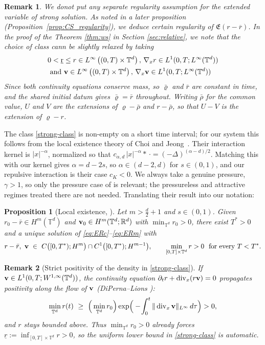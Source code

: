 \documentclass[12pt,a4paper,twoside]{article}
\newcommand{\Ov}[1]{\overline{#1}}
\newcommand{\vr}{\varrho}
\newcommand{\vv}{\vc{v}}
\newcommand{\vc}[1]{{\bf #1}}
\newcommand{\lr}[1]{\left( #1 \right)}
\newtheorem{prop}[thm]{Proposition}
\newtheorem{rmk}{Remark}
\numberwithin{equation}{section}%
\newcommand{\T}{\mathbb{T}}
\newcommand{\Gradx}{\nabla_x}
\newcommand{\Divx}{\operatorname{div}_x}
\begin{document}
	\begin{rmk}
		We donot put any separate regularity assumption for the extended variable of strong solution.  As noted in a later proposition (Proposition~\ref{prop:CS_regularity}), we deduce certain regularity of $\mathfrak{E}(r-\Ov{r})$. In the proof of the Theorem \ref{thm:ws} in Section \ref{sec:relative}, we note that the choice of class cann be slightly relaxed by taking 
		\begin{align*}
	&	0 <	\underbar{r}\leq r \in L^\infty\lr{(0,T)\times \T^d}, \, \Gradx r \in L^1(0,T; L^\infty(\T^d)) \\ &\text{ and }  \vv \in L^\infty\lr{(0,T)\times \T^d}, \, \Gradx \vv \in L^1(0,T; L^\infty(\T^d)) 
		\end{align*}
			Since both continuity equations conserve mass, so $\bar\vr$ and $\bar r$ are constant in time, and the shared initial datum gives $\bar\vr=\bar r$ throughout. Writing $\bar\rho$ for the common value, $U$ and $V$ are the extensions of $\vr-\bar\rho$ and $r-\bar\rho$, so that $U-V$ is the extension of $\vr-r$.
	\end{rmk} 
	
	\medskip

The class \eqref{strong-class} is non-empty on a short time interval; for our system this
follows from the local existence theory of Choi and Jeong~\cite{CJ2022}. Their interaction
kernel is $|x|^{-\alpha}$, normalized so that $c_{\alpha,d}\,|x|^{-\alpha}\ast\,\cdot
=(-\Delta)^{(\alpha-d)/2}$. Matching this with our kernel gives $\alpha=d-2s$, so
$\alpha\in(d-2,d)$ for $s\in(0,1)$, and our repulsive interaction is their case $c_K<0$. We
always take a genuine pressure, $\gamma>1$, so only the pressure case of \cite{CJ2022} is
relevant; the pressureless and attractive regimes treated there are not needed. Translating
their result into our notation:

\begin{prop}[Local existence, {\cite[Thm.~4.1 and Rmk.~4.3]{CJ2022}}]\label{prop:local-existence}
	Let $m>\tfrac d2+1$ and $s\in(0,1)$. Given $r_0-\bar r\in H^m(\mathbb T^d)$ and
	$\vv_0\in H^m(\mathbb T^d;\mathbb R^d)$ with $\min_{\mathbb T^d} r_0>0$, there exist $T^*>0$
	and a unique solution of \eqref{eq:ERc}--\eqref{eq:ERm} with
	\[
	r-\bar r,\ \vv\ \in\ C\big([0,T^*);H^m\big)\cap C^1\big([0,T^*);H^{m-1}\big),
	\qquad \min_{[0,T]\times\mathbb T^d} r>0 \ \text{ for every } T<T^*.
	\]
\end{prop}

\begin{rmk}[Strict positivity of the density in \eqref{strong-class}]\label{rem:strong-class}
	If $\vv\in L^1(0,T;W^{1,\infty}(\T^d))$, the continuity equation
	$\partial_t r+\Divx(r\vv)=0$ propagates positivity along the flow of $\vv$ (DiPerna--Lions
	\cite{DiL1989}):
	\[
	\min_{\mathbb T^d} r(t)\ \ge\ \Big(\min_{\mathbb T^d} r_0\Big)
	\exp\!\Big(-\!\int_0^t\|\Divx\vv\|_{L^\infty}\,d\tau\Big)>0 ,
	\]
	and $r$ stays bounded above. Thus $\min_{\T^d} r_0>0$ already forces
	$\underline r:=\inf_{[0,T]\times\T^d} r>0$, so the uniform lower bound in \eqref{strong-class}
	is automatic.
\end{rmk}
\end{document}

